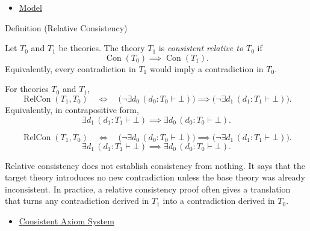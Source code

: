 \begin{dependencies}
\begin{itemize}
  \item \hyperref[def:axiom-systems-model]{Model}
\end{itemize}
\end{dependencies}

\begin{definitionbox}{Definition (Relative Consistency)}
\begin{definition}
\label{def:axiom-systems-relative-consistency}
Let $T_0$ and $T_1$ be theories. The theory $T_1$ is
\emph{consistent relative to $T_0$} if
\[
  \operatorname{Con}(T_0)\implies \operatorname{Con}(T_1).
\]
Equivalently, every contradiction in $T_1$ would imply a contradiction in
$T_0$.
\end{definition}
\end{definitionbox}
\begin{remark*}
For theories $T_0$ and $T_1$,
\[
  \operatorname{RelCon}(T_1,T_0)
  \quad\Longleftrightarrow\quad
  \bigl(\neg\exists d_0\,(d_0:T_0\vdash\bot)\bigr)
  \implies
  \bigl(\neg\exists d_1\,(d_1:T_1\vdash\bot)\bigr).
\]
Equivalently, in contrapositive form,
\[
  \exists d_1\,(d_1:T_1\vdash\bot)
  \implies
  \exists d_0\,(d_0:T_0\vdash\bot).
\]
\end{remark*}

\begin{remark*}
\[
\operatorname{RelCon}(T_1,T_0)
  \quad\Longleftrightarrow\quad
  \bigl(\neg\exists d_0\,(d_0:T_0\vdash\bot)\bigr)
  \implies
  \bigl(\neg\exists d_1\,(d_1:T_1\vdash\bot)\bigr).
\]
\[
\exists d_1\,(d_1:T_1\vdash\bot)
  \implies
  \exists d_0\,(d_0:T_0\vdash\bot).
\]
\end{remark*}




\begin{remark*}[Interpretation]
Relative consistency does not establish consistency from nothing. It says that
the target theory introduces no new contradiction unless the base theory was
already inconsistent. In practice, a relative consistency proof often gives a
translation that turns any contradiction derived in $T_1$ into a contradiction
derived in $T_0$.
\end{remark*}

\begin{dependencies}
\begin{itemize}
  \item \hyperref[def:axiom-systems-consistent-axiom-system]{Consistent Axiom System}
\end{itemize}
\end{dependencies}
